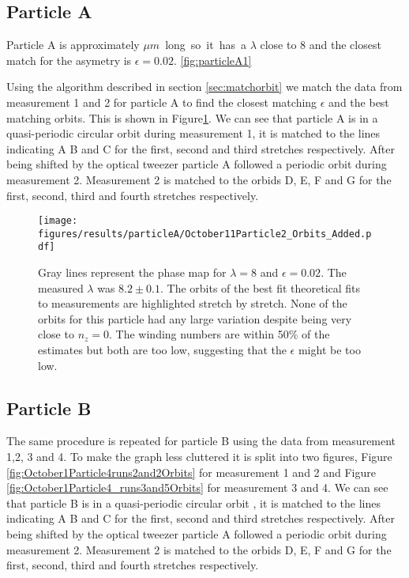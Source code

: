 \subsection{Particle A}
Particle A is approximately \unit[24]{$\mu m$} long so it has a $\lambda$ close to 8 and the closest match for the asymetry is $\epsilon = 0.02$. \ref{fig:particleA1}


Using the algorithm described in section \ref{sec:matchorbit} we match the data from measurement 1 and 2 for particle A to find the closest matching $\epsilon$ and the best matching orbits. This is shown in Figure\ref{fig:particleAOrbitFit}. We can see that particle A is in a quasi-periodic circular orbit during measurement 1, it is matched to the lines indicating A B and C for the first, second and third stretches respectively.  After being shifted by  the optical tweezer particle A followed a periodic orbit during measurement 2. Measurement 2 is matched to the orbids D, E, F and G for the first, second, third and fourth stretches respectively. 

\begin{figure}[H]
\begin{center}
\texttt{[image: figures/results/particleA/October11Particle2\_Orbits\_Added.pdf]}
\end{center}
\caption{Gray lines represent the phase map for $\lambda = 8$ and $\epsilon = 0.02$. The measured $\lambda$ was $8.2 \pm 0.1$. The orbits of the best fit theoretical fits to measurements are highlighted stretch by stretch. None of the orbits for this particle had any large variation despite being very close to $n_z=0$. The winding numbers are within 50\% of the estimates but both are too low, suggesting that the $\epsilon$ might be too low.}
\label{fig:particleAOrbitFit}
\end{figure}

\subsection{Particle B}

The same procedure is repeated for particle B using the data from measurement 1,2, 3 and 4. To make the graph less cluttered it is split into two figures, Figure \ref{fig:October1Particle4runs2and2Orbits} for measurement 1 and 2 and Figure \ref{fig:October1Particle4_runs3and5Orbits} for measurement 3 and 4. We can see that particle B is in a quasi-periodic circular orbit , it is matched to the lines indicating A B and C for the first, second and third stretches respectively.  After being shifted by  the optical tweezer particle A followed a periodic orbit during measurement 2. Measurement 2 is matched to the orbids D, E, F and G for the first, second, third and fourth stretches respectively. 

